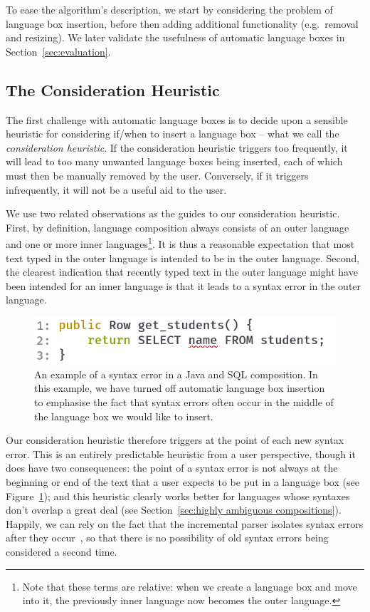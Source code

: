 \documentclass[sigplan,screen]{acmart}
\begin{document}
To ease the algorithm's description, we start by considering the problem of language box
insertion, before then adding additional functionality (e.g.~removal and
resizing). We later validate the usefulness of automatic language boxes in
Section~\ref{sec:evaluation}.


\subsection{The Consideration Heuristic}

The first challenge with automatic language boxes is to decide upon a sensible
heuristic for considering if/when to insert a language box -- what we call the
\emph{consideration heuristic}. If the consideration heuristic triggers too
frequently, it will lead to too many unwanted language boxes being inserted,
each of which must then be manually removed by the user.
Conversely, if it triggers infrequently, it will not be a useful aid to the user.

We use two related observations as the guides to our consideration heuristic.
First, by definition, language composition always consists of an outer language
and one or more inner languages\footnote{Note that these terms are relative:
when we create a language box and move into it, the previously inner language
now becomes the outer language.}. It is thus a reasonable expectation that most
text typed in the outer language is intended to be in the outer language.
Second, the clearest indication that recently typed text in the outer language
might have been intended for an inner language is that it leads to a syntax error
in the outer language.

\begin{figure}[tb]
    \includegraphics[width=.40\textwidth]{images/composition_error1.png}
    \caption{An example of a syntax error in a Java and SQL composition. In
      this example, we have turned off automatic language box insertion to
      emphasise the fact that syntax errors often occur in the middle of the
      language box we would like to insert.}
\label{fig:consideration}
\end{figure}

Our consideration heuristic therefore triggers at the point of each new syntax error.
This is an entirely predictable heuristic from a user perspective, though it
does have two consequences: the point of a syntax error is not always at the
beginning or end of the text that a user expects to be put in a language box
(see Figure~\ref{fig:consideration}); and this heuristic clearly works better
for languages whose syntaxes don't overlap a great deal (see
Section~\ref{sec:highly ambiguous compositions}). Happily, we can rely
on the fact that the incremental parser isolates syntax errors after they
occur~\cite[p.~93]{wagner98practicalalgorithms}, so that there is no
possibility of old syntax errors being considered a second time.
\end{document}
